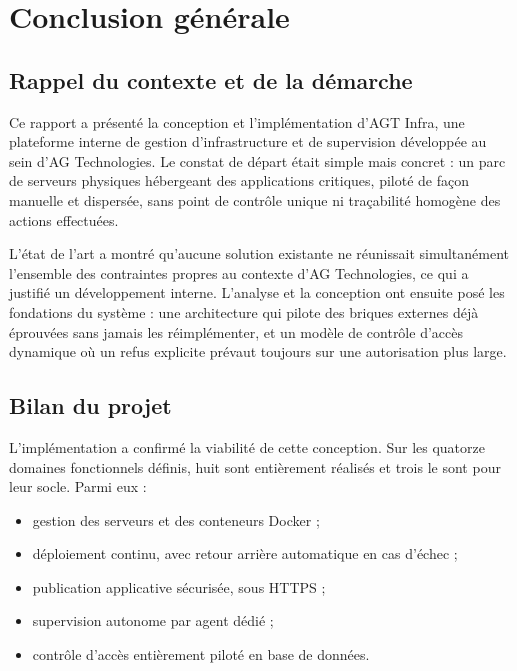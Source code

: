\chapter*{Conclusion générale}

\section*{Rappel du contexte et de la démarche}

Ce rapport a présenté la conception et l'implémentation d'AGT Infra, une
plateforme interne de gestion d'infrastructure et de supervision
développée au sein d'AG Technologies. Le constat de départ était simple
mais concret : un parc de serveurs physiques hébergeant des applications
critiques, piloté de façon manuelle et dispersée, sans point de contrôle
unique ni traçabilité homogène des actions effectuées.

L'état de l'art a montré qu'aucune solution existante ne réunissait
simultanément l'ensemble des contraintes propres au contexte d'AG
Technologies, ce qui a justifié un développement interne. L'analyse et
la conception ont ensuite posé les fondations du système : une
architecture qui pilote des briques externes déjà éprouvées sans jamais
les réimplémenter, et un modèle de contrôle d'accès dynamique où un
refus explicite prévaut toujours sur une autorisation plus large.

\section*{Bilan du projet}

L'implémentation a confirmé la viabilité de cette conception. Sur les
quatorze domaines fonctionnels définis, huit sont entièrement réalisés
et trois le sont pour leur socle. Parmi eux :

\begin{itemize}
  \item gestion des serveurs et des conteneurs Docker ;
  \item déploiement continu, avec retour arrière automatique en cas
        d'échec ;
  \item publication applicative sécurisée, sous HTTPS ;
  \item supervision autonome par agent dédié ;
  \item contrôle d'accès entièrement piloté en base de données.
\end{itemize}


